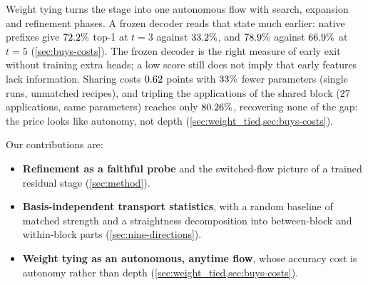 Weight tying turns the stage into one autonomous flow with search, expansion and
refinement phases.
A frozen decoder reads that state much earlier: native prefixes give
$72.2\%$ top-1 at $t{=}3$ against $33.2\%$, and
$78.9\%$ against $66.9\%$ at $t{=}5$
(\cref{sec:buys-costs}).
The frozen decoder is the right measure of early exit without training extra heads;
a low score still does not imply that early features lack information.
Sharing costs $0.62$ points with $33\%$ fewer parameters
(single runs, unmatched recipes), and tripling the applications of the shared block
($27$ applications, same parameters) reaches only $80.26\%$, recovering
none of the gap: the price looks like autonomy, not depth
(\cref{sec:weight_tied,sec:buys-costs}).

Our contributions are:
\begin{itemize}
    \item \textbf{Refinement as a faithful probe} and the switched-flow picture of a
    trained residual stage (\cref{sec:method}).
    \item \textbf{Basis-independent transport statistics}, with a random baseline of
    matched strength and a straightness decomposition into between-block and
    within-block parts (\cref{sec:nine-directions}).
    \item \textbf{Weight tying as an autonomous, anytime flow}, whose accuracy cost
    is autonomy rather than depth (\cref{sec:weight_tied,sec:buys-costs}).
\end{itemize}
